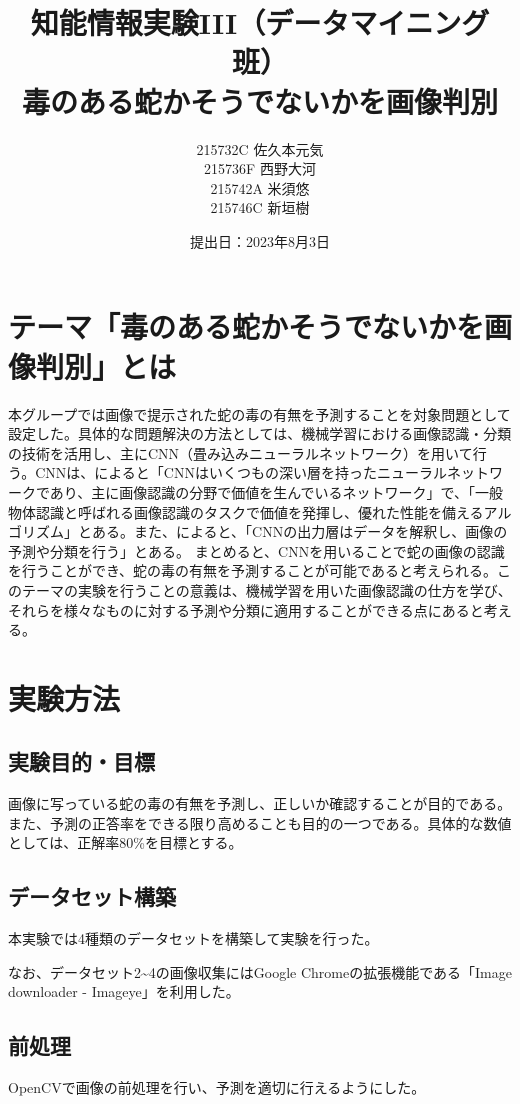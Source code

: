 \documentclass[a4paper, 11pt, titlepage]{jsarticle}
\title{知能情報実験III（データマイニング班）\\毒のある蛇かそうでないかを画像判別}
\author{215732C 佐久本元気\\215736F 西野大河\\215742A 米須悠\\215746C 新垣樹\\}
\date{提出日：2023年8月3日}
\begin{document}
\maketitle
\tableofcontents
\clearpage

\section{テーマ「毒のある蛇かそうでないかを画像判別」とは}
本グループでは画像で提示された蛇の毒の有無を予測することを対象問題として設定した。具体的な問題解決の方法としては、機械学習における画像認識・分類の技術を活用し、主にCNN（畳み込みニューラルネットワーク）を用いて行う。CNNは、\cite{theme1}によると「CNNはいくつもの深い層を持ったニューラルネットワークであり、主に画像認識の分野で価値を生んでいるネットワーク」で、「一般物体認識と呼ばれる画像認識のタスクで価値を発揮し、優れた性能を備えるアルゴリズム」とある。また、\cite{theme2}によると、「CNNの出力層はデータを解釈し、画像の予測や分類を行う」とある。
まとめると、CNNを用いることで蛇の画像の認識を行うことができ、蛇の毒の有無を予測することが可能であると考えられる。このテーマの実験を行うことの意義は、機械学習を用いた画像認識の仕方を学び、それらを様々なものに対する予測や分類に適用することができる点にあると考える。

\section{実験方法}
\subsection{実験目的・目標}
画像に写っている蛇の毒の有無を予測し、正しいか確認することが目的である。また、予測の正答率をできる限り高めることも目的の一つである。具体的な数値としては、正解率80\%を目標とする。

\subsection{データセット構築}
本実験では4種類のデータセットを構築して実験を行った。\par
なお、データセット2\textasciitilde4の画像収集にはGoogle Chromeの拡張機能である「Image downloader - Imageye」を利用した。\par

\subsection{前処理}
OpenCVで画像の前処理を行い、予測を適切に行えるようにした。 \par
\end{document}
